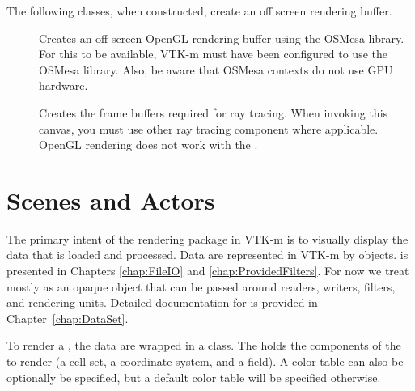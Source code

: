 The following classes, when constructed, create an off screen rendering
buffer.

\begin{description}
\item[] 
    Creates an off screen OpenGL
  rendering buffer using the OSMesa library. For this to be available,
  VTK-m must have been configured to use the OSMesa library. Also, be aware
  that OSMesa contexts do not use GPU hardware.
\item[] 
    Creates the frame
  buffers required for ray tracing. When invoking this canvas, you must use
  other ray tracing component where applicable. OpenGL rendering does not
  work with the .
\end{description}




\section{Scenes and Actors}


The primary intent of the rendering package in VTK-m is to visually display
the data that is loaded and processed. Data are represented in VTK-m by
 objects.  is presented in
Chapters \ref{chap:FileIO} and \ref{chap:ProvidedFilters}. For now we treat
 mostly as an opaque object that can be passed
around readers, writers, filters, and rendering units. Detailed
documentation for  is provided in
Chapter~\ref{chap:DataSet}.

To render a , the data are wrapped in a
 class. The  holds the
components of the  to render (a cell set, a
coordinate system, and a field). A color table can also be optionally be
specified, but a default color table will be specified otherwise.



